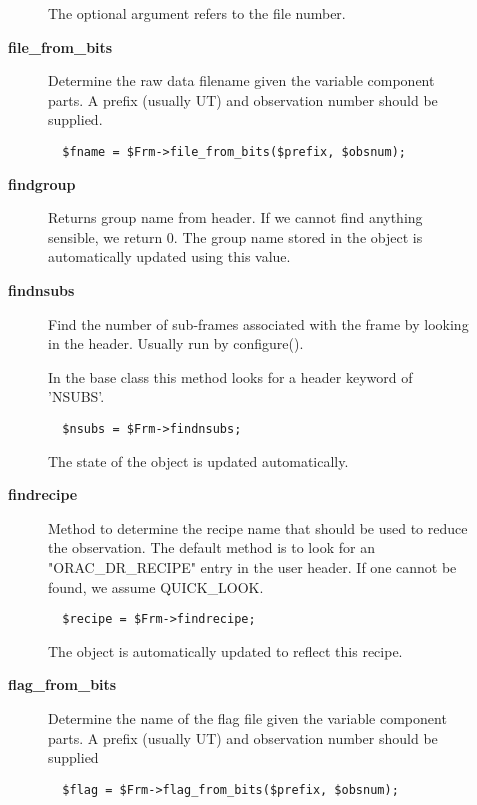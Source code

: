 \begin{description}
\begin{description}
The optional argument refers to the file number.


\item[{\textbf{file\_from\_bits}}] \mbox{}

Determine the raw data filename given the variable component
parts. A prefix (usually UT) and observation number should
be supplied.

\begin{verbatim}
  $fname = $Frm->file_from_bits($prefix, $obsnum);
\end{verbatim}

\item[{\textbf{findgroup}}] \mbox{}

Returns group name from header.  If we cannot find anything sensible,
we return 0.  The group name stored in the object is automatically
updated using this value.


\item[{\textbf{findnsubs}}] \mbox{}

Find the number of sub-frames associated with the frame by looking in
the header. Usually run by configure().



In the base class this method looks for a header keyword of 'NSUBS'.

\begin{verbatim}
  $nsubs = $Frm->findnsubs;
\end{verbatim}


The state of the object is updated automatically.


\item[{\textbf{findrecipe}}] \mbox{}

Method to determine the recipe name that should be used to reduce the
observation.  The default method is to look for an "ORAC\_DR\_RECIPE" entry
in the user header. If one cannot be found, we assume QUICK\_LOOK.

\begin{verbatim}
  $recipe = $Frm->findrecipe;
\end{verbatim}


The object is automatically updated to reflect this recipe.


\item[{\textbf{flag\_from\_bits}}] \mbox{}

Determine the name of the flag file given the variable
component parts. A prefix (usually UT) and observation number
should be supplied

\begin{verbatim}
  $flag = $Frm->flag_from_bits($prefix, $obsnum);
\end{verbatim}



\end{description}
\end{description}
